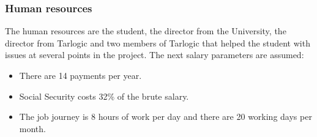 \subsubsection{Human resources}
\newcommand{\hourBias}{\the\numexpr 20*14*8 \relax}
\newcommand{\ProjectManagerAnnual}{45448}
\newcommand{\SeniorEngineerAnnual}{29754}
\newcommand{\SysAdminAnnual}{24234}
\newcommand{\JuniorDeveloperAnnual}{16000}
\newcommand{\ProjectManagerSC}{   \fpeval{trunc(\ProjectManagerAnnual * 0.32 ,2)}}
\newcommand{\ProjectManagerTotal}{\fpeval{trunc(\ProjectManagerAnnual * 1.32 ,2)}}
\newcommand{\ProjectManagerHour}{ \fpeval{trunc(\ProjectManagerTotal  / \hourBias ,2)}}
\newcommand{\SeniorEngineerSC}{\fpeval{trunc(   \SeniorEngineerAnnual * 0.32 ,2)}}
\newcommand{\SeniorEngineerTotal}{\fpeval{trunc(\SeniorEngineerAnnual * 1.32 ,2)}}
\newcommand{\SeniorEngineerHour}{\fpeval{trunc( \SeniorEngineerTotal  / \hourBias ,2)}}
\newcommand{\SysAdminSC}{\fpeval{trunc(   \SysAdminAnnual * 0.32 ,2)}}
\newcommand{\SysAdminTotal}{\fpeval{trunc(\SysAdminAnnual * 1.32 ,2)}}
\newcommand{\SysAdminHour}{\fpeval{trunc( \SysAdminTotal  / \hourBias ,2)}}
\newcommand{\JuniorDeveloperSC}{\fpeval{trunc(   \JuniorDeveloperAnnual * 0.32 ,2)}}
\newcommand{\JuniorDeveloperTotal}{\fpeval{trunc(\JuniorDeveloperAnnual * 1.32 ,2)}}
\newcommand{\JuniorDeveloperHour}{\fpeval{trunc( \JuniorDeveloperTotal  / \hourBias ,2)}}
\newcommand{\TutorHours}{11.25}
\newcommand{\ProjectManagerRoleHours}{\fpeval{trunc( \TutorHours * 2 ,2)}}
\newcommand{\ProjectManagerHourTotal}{\fpeval{trunc( \ProjectManagerHour * \TutorHours * 2 ,2)}}
\newcommand{\SeniorEngineerHourTotal}{\fpeval{trunc( \SeniorEngineerHour * \TutorHours ,2)}}
\newcommand{\SysAdminHourTotal}{\fpeval{trunc( \SysAdminHour * \TutorHours ,2)}}
\newcommand{\JuniorDeveloperHourTotal}{\fpeval{trunc( \JuniorDeveloperHour * \projecthours ,2)}}
\newcommand{\HRTotal}{\fpeval{trunc( \ProjectManagerHourTotal + \SeniorEngineerHourTotal + \SysAdminHourTotal + \JuniorDeveloperHourTotal,2)}}
The human resources are the student, the director from the University, the director from Tarlogic and two members of Tarlogic that helped the student with issues at several points in the project.
\linej
\linej
The next salary parameters are assumed:
\begin{itemize}
	\item There are 14 payments per year.
	\item Social Security costs 32\% of the brute salary.
	\item The job journey is 8 hours of work per day and there are 20 working days per month.
\end{itemize}
